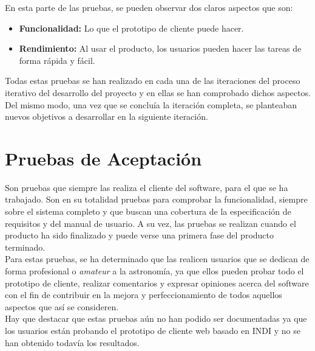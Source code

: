 En esta parte de las pruebas, se pueden observar dos claros aspectos que son:
\begin{itemize}
  \item \textbf{Funcionalidad:} Lo que el prototipo de cliente puede hacer.
  \item \textbf{Rendimiento:} Al usar el producto, los usuarios pueden hacer las tareas de forma rápida y fácil.
\end{itemize}
Todas estas pruebas se han realizado en cada una de las iteraciones del proceso iterativo del desarrollo del proyecto y en ellas se han comprobado dichos aspectos. Del mismo modo, una vez que se concluía  la iteración completa, se planteaban nuevos objetivos a desarrollar en la siguiente iteración.

\section{Pruebas de Aceptación}
Son pruebas que siempre las realiza el cliente del software, para el que se ha trabajado.
Son en su totalidad pruebas para comprobar la funcionalidad, siempre sobre el sistema completo y que buscan una cobertura de la especificación de requisitos y del manual de usuario. A su vez, las pruebas se realizan cuando el producto ha sido finalizado y puede verse una primera fase del producto terminado.\\

Para estas pruebas, se ha determinado que las realicen usuarios que se dedican de forma profesional o \textit{amateur} a la astronomía, ya que ellos pueden probar todo el prototipo de cliente, realizar comentarios y expresar opiniones acerca del software con el fin de contribuir en la mejora y perfeccionamiento de todos aquellos aspectos que así se consideren. \\

Hay que destacar que estas pruebas aún no han podido ser documentadas ya que los usuarios están probando el prototipo de cliente web basado en INDI y no se han obtenido todavía los resultados.
